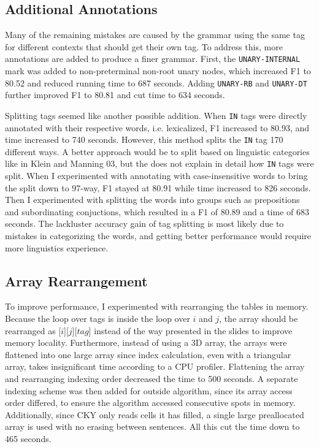 \documentclass[11pt]{article}
\begin{document}
\subsection{Additional Annotations}
Many of the remaining mistakes are caused by the grammar using the same tag for different contexts
that should get their own tag. To address this, more annotations are added to produce a finer grammar.
First, the \texttt{UNARY-INTERNAL} mark was added to non-preterminal non-root unary nodes,
which increased F1 to 80.52 and reduced running time to 687 seconds. Adding \texttt{UNARY-RB} and
\texttt{UNARY-DT} further improved F1 to 80.81 and cut time to 634 seconds.

Splitting tags seemed like another possible addition. When \texttt{IN} tags were directly
annotated with their respective words, i.e. lexicalized, F1 increased to 80.93, and time increased to
740 seconds. However, this method splits the \texttt{IN} tag 170 different ways. A better approach
would be to split based on linguistic categories like in Klein and Manning 03,
but the does not explain in detail how \texttt{IN} tags were split. When I experimented with
annotating with case-insensitive words to bring the split down to 97-way, F1 stayed at 80.91
while time increased to 826 seconds. Then I experimented with splitting the words into groups
such as prepositions and subordinating conjuctions, which resulted in a F1 of 80.89 and a time of
683 seconds. The lackluster accuracy gain of tag splitting is most likely due to mistakes in
categorizing the words, and getting better performance would require more linguistics experience.

\subsection{Array Rearrangement}
To improve performance, I experimented with rearranging the tables in memory. Because the loop over
tags is inside the loop over $i$ and $j$, the array should be rearranged as [$i$][$j$][$tag$] instead
of the way presented in the slides to improve memory locality. Furthermore, instead of using a
3D array, the arrays were flattened into one large array since index calculation,
even with a triangular array, takes insignificant time according to a CPU profiler. Flattening the
array and rearranging indexing order decreased the time to 500 seconds. A separate indexing scheme
was then added for outside algorithm, since its array access order differed, to ensure the algorithm
accessed consecutive spots in memory. Additionally, since CKY only reads cells it has filled,
a single large preallocated array is used with no erasing between sentences. All this cut the time down
to 465 seconds.
\end{document}
